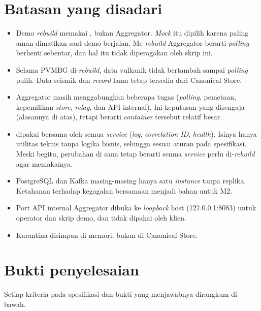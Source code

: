 \section{Batasan yang disadari}

\begin{itemize}
 \item Demo \emph{rebuild} memakai , bukan Aggregator. \emph{Mock} itu dipilih karena paling aman dimatikan saat demo berjalan. Me-\emph{rebuild} Aggregator berarti \emph{polling} berhenti sebentar, dan hal itu tidak diperagakan oleh skrip ini.
 \item Selama PVMBG di-\emph{rebuild}, data vulkanik tidak bertambah sampai \emph{polling} pulih. Data seismik dan \emph{record} lama tetap tersedia dari Canonical Store.
 \item Aggregator masih menggabungkan beberapa tugas (\emph{polling}, pemetaan, kepemilikan \emph{store}, \emph{relay}, dan API internal). Ini keputusan yang disengaja (alasannya di atas), tetapi berarti \emph{container} tersebut relatif besar.
 \item {} dipakai bersama oleh semua \emph{service} (\emph{log}, \emph{correlation ID}, \emph{health}). Isinya hanya utilitas teknis tanpa logika bisnis, sehingga sesuai aturan pada spesifikasi. Meski begitu, perubahan di sana tetap berarti semua \emph{service} perlu di-\emph{rebuild} agar memakainya.
 \item PostgreSQL dan Kafka masing-masing hanya satu \emph{instance} tanpa replika. Ketahanan terhadap kegagalan bersamaan menjadi bahan untuk M2.
 \item Port API internal Aggregator dibuka ke \emph{loopback} host (127.0.0.1:8083) untuk operator dan skrip demo, dan tidak dipakai oleh klien.
 \item Karantina disimpan di memori, bukan di Canonical Store.
\end{itemize}

\section{Bukti penyelesaian}

Setiap kriteria pada spesifikasi dan bukti yang menjawabnya dirangkum di bawah.

